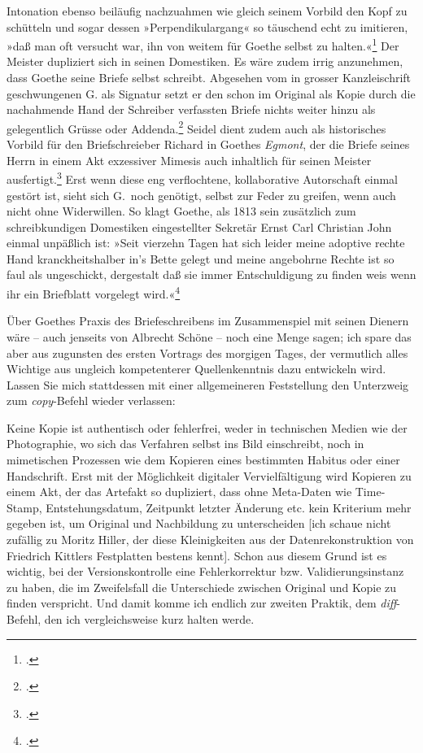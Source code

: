 \documentclass[a4paper,12pt]{article}
\newcommand{\anf}[1]{»#1«}
\begin{document}
Intonation ebenso beiläufig nachzuahmen wie gleich seinem Vorbild den Kopf zu schütteln und sogar dessen \anf{Perpendikulargang} so täuschend echt zu imitieren, \anf{daß man oft versucht war, ihn von weitem für Goethe selbst zu halten.}\footcite[S.~47]{lyncker:1912} Der Meister dupliziert sich in seinen Domestiken. Es wäre zudem irrig anzunehmen, dass Goethe seine Briefe selbst schreibt. Abgesehen vom in grosser Kanzleischrift geschwungenen G. als Signatur setzt er den schon im Original als Kopie durch die nachahmende Hand der Schreiber verfassten Briefe nichts weiter hinzu als gelegentlich Grüsse oder Addenda.\footcite[40]{schleif:1965} Seidel dient zudem auch als historisches Vorbild für den Briefschreieber Richard in Goethes \emph{Egmont}, der die Briefe seines Herrn in einem Akt exzessiver Mimesis auch inhaltlich für seinen Meister ausfertigt.\footcite[Vgl.][253–256]{krajewski:2010} Erst wenn diese eng verflochtene, kollaborative Autorschaft einmal gestört ist, sieht sich G.\ noch genötigt, selbst zur Feder zu greifen, wenn auch nicht ohne Widerwillen. So klagt Goethe, als 1813 sein zusätzlich zum schreibkundigen Domestiken eingestellter Sekretär Ernst Carl Christian John einmal unpäßlich ist: \anf{Seit vierzehn Tagen hat sich leider meine adoptive rechte Hand kranckheitshalber in's Bette gelegt und meine angebohrne Rechte ist so faul als ungeschickt, dergestalt daß sie immer Entschuldigung zu finden weis wenn ihr ein Briefblatt\index{Brief} vorgelegt wird.}\footcite[][Nachträge: Briefe, Bd.~51, S.~342]{goethe:1887}

Über Goethes Praxis des Briefeschreibens im Zusammenspiel mit seinen Dienern wäre – auch jenseits von Albrecht Schöne – noch eine Menge sagen; ich spare das aber aus zugunsten des ersten Vortrags des morgigen Tages, der vermutlich alles Wichtige aus ungleich kompetenterer Quellenkenntnis dazu entwickeln wird. Lassen Sie mich stattdessen mit einer allgemeineren Feststellung den Unterzweig zum \emph{copy}-Befehl wieder verlassen: 

Keine Kopie ist authentisch oder fehlerfrei, weder in technischen Medien wie der Photographie, wo sich das Verfahren selbst ins Bild einschreibt, noch in mimetischen Prozessen wie dem Kopieren eines bestimmten Habitus oder einer Handschrift. Erst mit der Möglichkeit digitaler Vervielfältigung wird Kopieren zu einem Akt, der das Artefakt so dupliziert, dass ohne Meta-Daten wie Time-Stamp, Entstehungsdatum, Zeitpunkt letzter Änderung etc. kein Kriterium mehr gegeben ist, um Original und Nachbildung zu unterscheiden [ich schaue nicht zufällig zu Moritz Hiller, der diese Kleinigkeiten aus der Datenrekonstruktion von Friedrich Kittlers Festplatten bestens kennt]. Schon aus diesem Grund ist es wichtig, bei der Versionskontrolle eine Fehlerkorrektur bzw. Validierungsinstanz zu haben, die im Zweifelsfall die Unterschiede zwischen Original und Kopie zu finden verspricht. Und damit komme ich endlich zur zweiten Praktik, dem \emph{diff}-Befehl, den ich vergleichsweise kurz halten werde.
\end{document}
